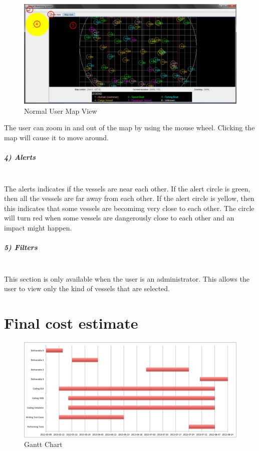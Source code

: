 \documentclass{article}
\begin{document}
	\begin{figure}[!htb]
	\caption{Normal User Map View}
	\centering
	\includegraphics[scale=0.36]{images/userManual3_user.jpg}
	\end{figure}

The user can zoom in and out of the map by using the mouse wheel. Clicking the map will cause it to move around.
\pagebreak
\subparagraph{4) Alerts \\ \\}
The alerts indicates if the vessels are near each other. If the alert circle is green, then all the vessels are far away from each other. If the alert circle is yellow, then this indicates that some vessels are becomimg very close to each other. The circle will turn red when some vessels are dangerously close to each other and an impact might happen.

\subparagraph{5) Filters \\ \\}
This section is only available when the user is an administrator. This allows the user to view only the kind of vessels that are selected.

\break

\section{Final cost estimate} %


\begin{figure}[!htb]
\caption{Gantt Chart}
\centering
\includegraphics[scale=0.55]{charts/GanttChart.png}
\end{figure}
\end{document}
